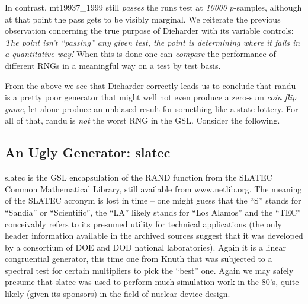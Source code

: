 \documentclass[12pt]{article}
\begin{document}
In contrast, mt19937\_1999 still {\em passes} the runs test at {\em
10000} $p$-samples, although at that point the pass gets to be visibly
marginal.  We reiterate the previous observation concerning the true
purpose of Dieharder with its variable controls: {\em The point isn't
``passing'' any given test, the point is determining where it fails in a
quantitative way!} When this is done one can {\em compare} the
performance of different RNGs in a meaningful way on a test by test
basis.

From the above we see that Dieharder correctly leads us to conclude that
randu is a pretty poor generator that might well not even produce a
zero-sum {\em coin flip game}, let alone produce an unbiased result for
something like a state lottery.  For all of that, randu is {\em not} the
worst RNG in the GSL.  Consider the following.

\subsection{An Ugly Generator: slatec}

slatec is the GSL encapsulation of the RAND function from the SLATEC
Common Mathematical Library, still available from
www.netlib.org\cite{slatec}.  The meaning of the SLATEC acronym is lost
in time -- one might guess that the ``S'' stands for ``Sandia'' or
``Scientific'', the ``LA'' likely stands for ``Los Alamos'' and the
``TEC'' conceivably refers to its presumed utility for technical
applications (the only header information available in the archived
sources suggest that it was developed by a consortium of DOE and DOD
national laboratories).  Again it is a linear congruential generator,
this time one from Knuth that was subjected to a spectral test for
certain multipliers to pick the ``best'' one.  Again we may safely
presume that slatec was used to perform much simulation work in the
80's, quite likely (given its sponsors) in the field of nuclear device
design.
\end{document}
